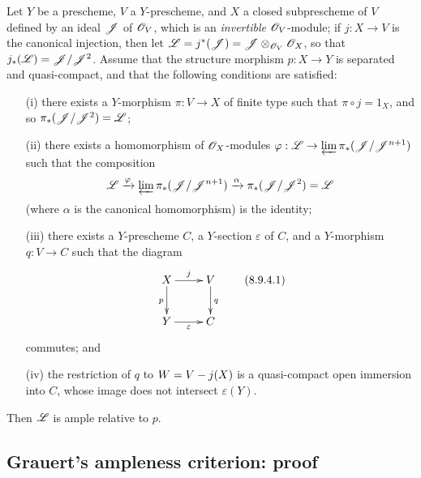 \begin{proposition}[8.9.4]
\label{II.8.9.4}
Let $Y$ be a prescheme, $V$ a $Y$-prescheme, and $X$ a closed subprescheme of $V$ defined by an ideal $\mathscr{J}$ of $\mathscr{O}_V$, which is an \emph{invertible} $\mathscr{O}_V$-module;
if $j:X\to V$ is
the canonical injection, then let $\mathscr{L} = j^*(\mathscr{J}) = \mathscr{J}\otimes_{\mathscr{O}_V}\mathscr{O}_X$, so that $j_*(\mathscr{L})=\mathscr{J}/\mathscr{J}^2$.
Assume that the structure morphism $p:X\to Y$ is separated and quasi-compact, and that the following conditions are satisfied:
\begin{enumerate}
  \item[\rm{(i)}] there exists a $Y$-morphism $\pi:V\to X$ of finite type such that $\pi\circ j=1_X$, and so $\pi_*(\mathscr{J}/\mathscr{J}^2)=\mathscr{L}$;
  \item[\rm{(ii)}] there exists a homomorphism of $\mathscr{O}_X$-modules $\varphi:\sh{L}\to\varprojlim\pi_*(\sh{J}/\sh{J}^{n+1})$ such that the composition
    \[
      \mathscr{L}
      \xrightarrow{\varphi}
      \varprojlim \pi_*(\mathscr{J}/\mathscr{J}^{n+1})
      \xrightarrow{\alpha}
      \pi_*(\mathscr{J}/\mathscr{J}^2) = \mathscr{L}
    \]
    (where $\alpha$ is the canonical homomorphism) is the identity;
  \item[\rm{(iii)}] there exists a $Y$-prescheme $C$, a $Y$-section $\varepsilon$ of $C$, and a $Y$-morphism $q:V\to C$ such that the diagram
    \[
    \label{II.8.9.4.1}
      \xymatrix{
        X
          \ar[r]^{j}
          \ar[d]_{p}
      & V
          \ar[d]^{q}
      \\Y
          \ar[r]_{\varepsilon}
      & C
      }
    \tag{8.9.4.1}
    \]
    commutes; and
  \item[\rm{(iv)}] the restriction of $q$ to $W=V- j(X)$ is a quasi-compact open immersion into $C$, whose image does not intersect $\varepsilon(Y)$.
\end{enumerate}
Then $\mathscr{L}$ is ample relative to $p$.
\end{proposition}


\subsection{Grauert's ampleness criterion: proof}
\label{subsection:II.8.10}

